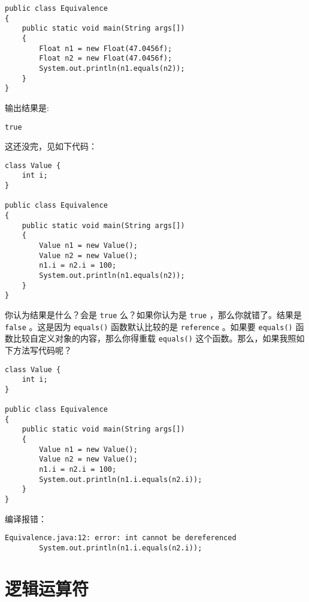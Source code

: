 \documentclass[10pt,a4paper,UTF8]{article}
\begin{document}
\lstset{language=java,label= ,caption= ,captionpos=b,firstnumber=1,numbers=left}
\begin{lstlisting}
public class Equivalence
{
    public static void main(String args[])
    {
        Float n1 = new Float(47.0456f);
        Float n2 = new Float(47.0456f);
        System.out.println(n1.equals(n2));
    }
}
\end{lstlisting}
输出结果是:
\begin{verbatim}
true
\end{verbatim}
这还没完，见如下代码：
\lstset{language=java,label= ,caption= ,captionpos=b,firstnumber=1,numbers=left}
\begin{lstlisting}
class Value {
    int i;
}

public class Equivalence
{
    public static void main(String args[])
    {
        Value n1 = new Value();
        Value n2 = new Value();
        n1.i = n2.i = 100;
        System.out.println(n1.equals(n2));
    }
}
\end{lstlisting}
你认为结果是什么？会是 \texttt{true} 么？如果你认为是 \texttt{true} ，那么你就错了。结果是 \texttt{false} 。这是因为 \texttt{equals()} 函数默认比较的是 \texttt{reference} 。如果要 \texttt{equals()} 函数比较自定义对象的内容，那么你得重载 \texttt{equals()} 这个函数。那么，如果我照如下方法写代码呢？
\lstset{language=java,label= ,caption= ,captionpos=b,firstnumber=1,numbers=left}
\begin{lstlisting}
class Value {
    int i;
}

public class Equivalence
{
    public static void main(String args[])
    {
        Value n1 = new Value();
        Value n2 = new Value();
        n1.i = n2.i = 100;
        System.out.println(n1.i.equals(n2.i));
    }
}
\end{lstlisting}
编译报错：
\begin{verbatim}
Equivalence.java:12: error: int cannot be dereferenced
        System.out.println(n1.i.equals(n2.i));
\end{verbatim}
\section{逻辑运算符}
\label{sec:orgheadline4}
\end{document}
